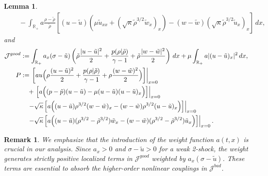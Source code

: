 \documentclass[11pt,reqno]{amsart}
\newtheorem{lemma}{Lemma}[section]
\newtheorem{remark}{Remark}[section]
\numberwithin{equation}{section} %
\begin{document}
\begin{lemma}
\begin{align*}
        &\quad -\int_{\mathbb{R}_+}a\frac{\rho-\tilde{\rho}}{\tilde{\rho}}\left[(u-\tilde{u})\left(\mu\tilde{u}_{xx}+(\sqrt{\kappa}\tilde{\rho}^{3/2}\tilde{w}_x)_x\right)-(w-\tilde{w})(\sqrt{\kappa}\tilde{\rho}^{3/2}\tilde{u}_x)_x\right]\,dx, 
    \end{align*}
    and
    \begin{align*}
         \mathcal{J}^{good}&:=\int_{\mathbb{R}_+}a_x(\sigma-\tilde{u})\left(\tilde{\rho}\frac{|u-\tilde{u}|^2}{2}+\frac{p(\rho|\tilde{\rho})}{\gamma-1} +\tilde{\rho}\frac{|w-\tilde{w}|^2}{2} \right)\,dx +\mu\int_{\mathbb{R}_+}a|(u-\tilde{u})_x|^2\,dx, \\
        P %
         &:=\left.\left[ a u\Bigl( \rho  \frac{(u-\tilde{u})^2}{2}+ \frac{p(\rho | \tilde{\rho})}{\gamma-1} + \rho  \frac{(w-\tilde{w})^2}{2} \Bigr) \right]\right|_{x=0}\\
         &\quad + \left.\left[ a \Bigl(  (p-\tilde{p}) (u-\tilde{u}) - \mu (u-\tilde{u}) (u-\tilde{u})_x \Bigr)\right]\right|_{x=0}\\
         &\quad \left. -\sqrt{\kappa} \left[ a \Bigl(   (u-\tilde{u})\rho^{3/2}(w-\tilde{w})_x - (w-\tilde{w})\rho^{3/2}(u-\tilde{u})_x \Bigr) \right]\right|_{x=0} \\
         &\quad \left. - \sqrt{\kappa} \left[ a \Bigl((u-\tilde{u})(\rho^{3/2}-\tilde{\rho}^{3/2})\tilde{w}_x -(w-\tilde{w})(\rho^{3/2}-\tilde{\rho}^{3/2})\tilde{u}_x \Bigr)\right]\right|_{x=0}.
    \end{align*}
\end{lemma}

\begin{remark}
    We emphasize that the introduction of the weight function $a(t,x)$ is crucial in our analysis. Since $a_x > 0$ and $\sigma - \tilde{u} > 0$ for a weak 2-shock, the weight generates strictly positive localized terms in $\mathcal{J}^{good}$ weighted by $a_x(\sigma-\tilde{u})$. These terms are essential to absorb the higher-order nonlinear couplings in $\mathcal{J}^{bad}$.
\end{remark}
\end{document}

